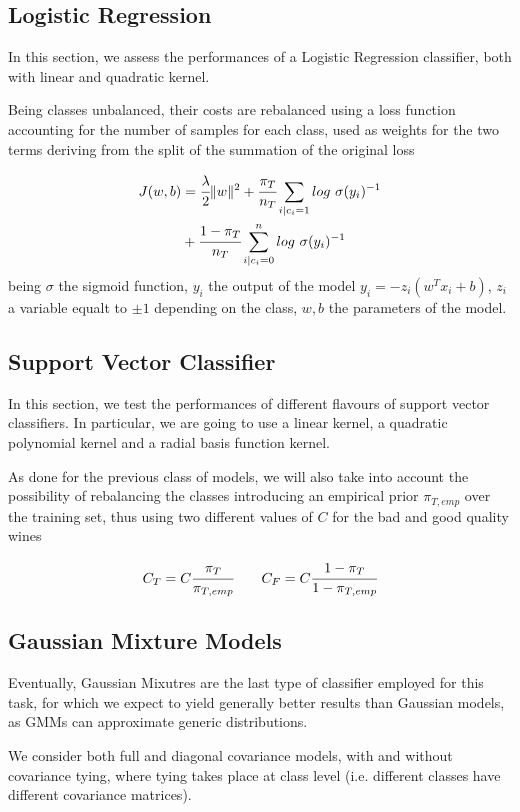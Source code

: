\subsection{Logistic Regression}

In this section, we assess the performances of a Logistic Regression classifier, both with linear and quadratic kernel.

Being classes unbalanced, their costs are rebalanced using a loss function accounting for the number of samples for each class, used as weights for the two terms deriving from the split of the summation of the original loss

\begin{align*}
	J(w, b) &= \cfrac{\lambda}{2} \|w\|^2 + \cfrac{\pi_T}{n_T} \sum_{i|c_i=1} log \ \sigma(y_i)^{-1} 
	\\ &+ \cfrac{1 - \pi_T}{n_T} \sum^n_{i| c_i=0} log \ \sigma(y_i)^{-1} 
\end{align*}
being $\sigma$ the sigmoid function, $y_i$ the output of the model $y_i = - z_i (w^T x_i + b)$, $z_i$ a variable equalt to $\pm 1$ depending on the class, $w, b$ the parameters of the model. 




\subsection{Support Vector Classifier}
In this section, we test the performances of 
different flavours of support vector classifiers. In particular, we are going to use a linear kernel, a quadratic polynomial kernel and a radial basis function kernel.

As done for the previous class of models, we will also take into account the possibility of rebalancing the classes introducing an empirical prior $\pi_{T,emp}$ over the training set, thus using two different values of $C$ for the bad and good quality wines

\begin{align*}
	C_T = C \cfrac{\pi_T}{\pi_{T,emp}} \ \ \ \ \ \
	C_F = C \cfrac{1 - \pi_T}{1 - \pi_{T,emp}} 
\end{align*}



\subsection{Gaussian Mixture Models}
Eventually, Gaussian Mixutres are the last type of classifier employed for this task, for which we expect to yield generally better results than Gaussian models, as GMMs can approximate generic distributions.

We consider both full and diagonal covariance models, with and without covariance tying, where tying takes place at class level (i.e. different classes have different covariance matrices).